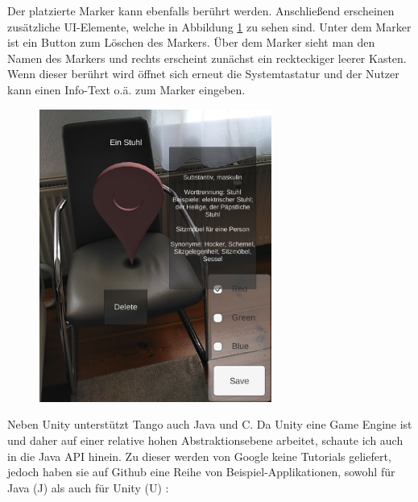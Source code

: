Der platzierte Marker kann ebenfalls berührt werden. Anschließend erscheinen zusätzliche UI-Elemente, welche in Abbildung \ref{example_app_tango_unity} zu sehen sind. Unter dem Marker ist ein Button zum Löschen des Markers. Über dem Marker sieht man den Namen des Markers und rechts erscheint zunächst ein reckteckiger leerer Kasten. Wenn dieser berührt wird öffnet sich erneut die Systemtastatur und der Nutzer kann einen Info-Text o.ä. zum Marker eingeben.

\begin{figure}[h]
	\centering
	\includegraphics[width=3in]{pictures/chair}
	\caption{}
	\label{example_app_tango_unity}
\end{figure}
Neben Unity unterstützt Tango auch Java und C. Da Unity eine Game Engine ist und daher auf einer relative hohen Abstraktionsebene arbeitet, schaute ich auch in die Java API hinein. Zu dieser werden von Google keine Tutorials geliefert, jedoch haben sie auf Github eine Reihe von Beispiel-Applikationen, sowohl für Java (J)  \cite{tango_java_github} als auch für Unity (U) \cite{tango_unity_github}:

